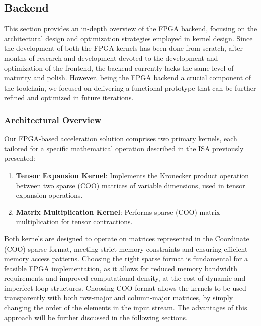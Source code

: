 \documentclass[12pt,oneside,a4paper]{article}
\begin{document}
\subsection{Backend}

This section provides an in-depth overview of the FPGA backend, focusing on the architectural design and optimization strategies employed in kernel design. Since the development of both the FPGA kernels has been done from scratch, after months of research and development devoted to the development and optimization of the frontend, the backend currently lacks the same level of maturity and polish. However, being the FPGA backend a crucial component of the toolchain, we focused on delivering a functional prototype that can be further refined and optimized in future iterations.

\subsubsection{Architectural Overview}

Our FPGA-based acceleration solution comprises two primary kernels, each tailored for a specific mathematical operation described in the ISA previously presented:

\begin{enumerate}
    \item \textbf{Tensor Expansion Kernel}: Implements the Kronecker product operation between two sparse (COO) matrices of variable dimensions, used in tensor expansion operations.
    \item \textbf{Matrix Multiplication Kernel}: Performs sparse (COO) matrix multiplication for tensor contractions.
\end{enumerate}

Both kernels are designed to operate on matrices represented in the Coordinate (COO) sparse format, meeting strict memory constraints and ensuring efficient memory access patterns. Choosing the right sparse format is fundamental for a feasible FPGA implementation\cite{FormatsHwSpMsurvey}, as it allows for reduced memory bandwidth requirements and improved computational density, at the cost of dynamic and imperfect loop structures. Choosing COO format allows the kernels to be used transparently with both row-major and column-major matrices, by simply changing the order of the elements in the input stream. The advantages of this approach will be further discussed in the following sections.
\end{document}
